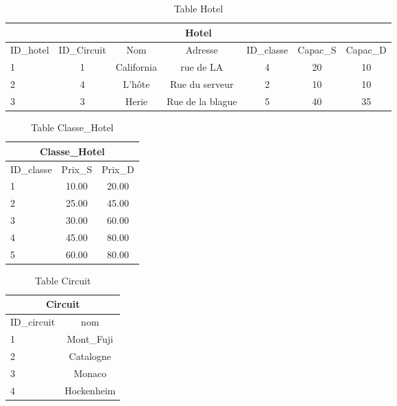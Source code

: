 
\begin{table}[h]
\begin{center}
\begin{tabular}{|l|c|c|c|c|c|c|}
\hline
\multicolumn{7}{|c|}{Hotel}\\
\hline
ID\_hotel& ID\_Circuit& Nom & Adresse &ID\_classe & Capac\_S & Capac\_D  \\
\hline
1 & 1& California&rue de LA& 4 & 20 & 10\\
\hline
2 & 4& L'h\^ote&Rue du serveur& 2 & 10 & 10\\
\hline
3 & 3& Herie&Rue de la blague& 5 & 40 & 35\\
\hline
\end{tabular}
\end{center}
\caption{Table Hotel}
\end{table}


\begin{table}[h]
\begin{center}
\begin{tabular}{|l|c|c|}
\hline
\multicolumn{3}{|c|}{Classe\_Hotel}\\
\hline
ID\_classe& Prix\_S & Prix\_D \\
\hline
1 & 10.00& 20.00\\
\hline
2 & 25.00& 45.00\\
\hline
3 & 30.00& 60.00\\
\hline
4 &  45.00& 80.00\\
\hline
5 & 60.00& 80.00\\
\hline
\end{tabular}
\end{center}
\caption{Table Classe\_Hotel}
\end{table}


\begin{table}[h]
\begin{center}
\begin{tabular}{|l|c|}
\hline
\multicolumn{2}{|c|}{Circuit}\\
\hline
ID\_circuit& nom \\
\hline
1 & Mont\_Fuji\\
\hline
2 & Catalogne\\
\hline
3 & Monaco\\
\hline
4 &  Hockenheim\\
\hline
\end{tabular}
\end{center}
\caption{Table Circuit}
\end{table}
\newpage

